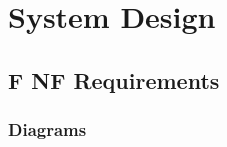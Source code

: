 \chapter{System Design}

\lipsum[4]

\section{F NF Requirements}

\lipsum

\subsection{Diagrams}

\lipsum
